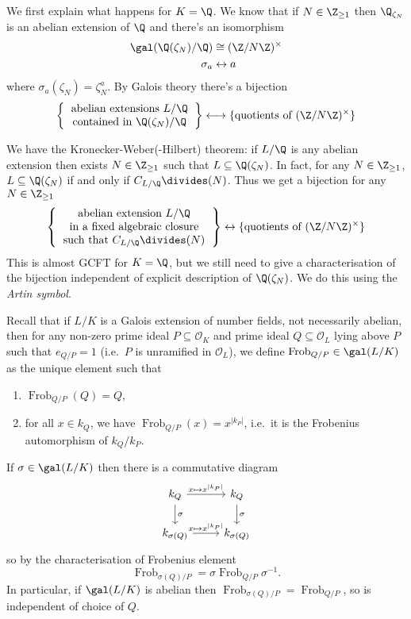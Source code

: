 \documentclass[a4paper]{article}
\renewcommand*{\O}{\mathcal{O}}
\DeclareMathOperator{\Frob}{Frob} %
\begin{document}
We first explain what happens for \(K = \Q\). We know that if \(N \in \Z_{\geq 1}\) then \(\Q_{\zeta_N}\) is an abelian extension of \(\Q\) and there's an isomorphism
\begin{align*}
  \gal(\Q(\zeta_N)/\Q) &\cong (\Z/N\Z)^\times \\
  \sigma_a &\leftrightarrow a
\end{align*}
where \(\sigma_a(\zeta_N) = \zeta_N^a\). By Galois theory there's a bijection
\[
  \left\{
  \begin{tabular}{c}
    abelian extensions \(L/\Q\) \\
    contained in \(\Q(\zeta_N)/\Q\)
  \end{tabular}
  \right\}
  \longleftrightarrow
  \{\text{quotients of } (\Z/N\Z)^\times\}
\]

We have the Kronecker-Weber(-Hilbert) theorem: if \(L/\Q\) is any abelian extension then exists \(N \in \Z_{\geq 1}\) such that \(L \subseteq \Q(\zeta_N)\). In fact, for any \(N \in \Z_{\geq 1}\), \(L \subseteq \Q(\zeta_N)\) if and only if \(C_{L/\Q} \divides (N)\). Thus we get a bijection for any \(N \in \Z_{\geq 1}\)
\[
  \left\{
    \begin{tabular}{c}
      abelian extension \(L/\Q\) \\
      in a fixed algebraic closure \\
      such that \(C_{L/\Q} \divides (N)\)
    \end{tabular}
  \right\}
  \leftrightarrow
  \{\text{quotients of } (\Z/N\Z)^\times\}
\]
This is almost GCFT for \(K = \Q\), but we still need to give a characterisation of the bijection independent of explicit description of \(\Q(\zeta_N)\). We do this using the \emph{Artin symbol}.

Recall that if \(L/K\) is a Galois extension of number fields, not necessarily abelian, then for any non-zero prime ideal \(P \subseteq \O_K\) and prime ideal \(Q \subseteq \O_L\) lying above \(P\) such that \(e_{Q/P} = 1\) (i.e.\ \(P\) is unramified in \(\O_L\)), we define \(\Frob_{Q/P} \in \gal(L/K)\) as the unique element such that
\begin{enumerate}
\item \(\Frob_{Q/P}(Q) = Q\),
\item for all \(x \in k_Q\), we have \(\Frob_{Q/P}(x) = x^{|k_P|}\), i.e.\ it is the Frobenius automorphism of \(k_Q/k_P\).
\end{enumerate}
If \(\sigma \in \gal(L/K)\) then there is a commutative diagram
\[
  \begin{tikzcd}
    k_Q \ar[r, "x \mapsto x^{|k_P|}"] \ar[d, "\sigma"] & k_Q \ar[d, "\sigma"] \\
    k_{\sigma(Q)} \ar[r, "x \mapsto x^{|k_P|}"] & k_{\sigma(Q)}
  \end{tikzcd}
\]
so by the characterisation of Frobenius element
\[
  \Frob_{\sigma(Q)/P} = \sigma \Frob_{Q/P} \sigma^{-1}.
\]
In particular, if \(\gal(L/K)\) is abelian then \(\Frob_{\sigma(Q)/P} = \Frob_{Q/P}\), so is independent of choice of \(Q\).
\end{document}
